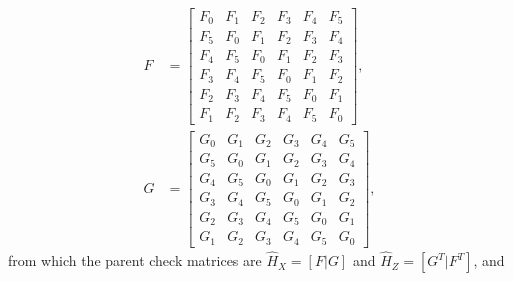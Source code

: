 \begin{align}
F &= \begin{bmatrix}
F_0 & F_1 & F_2 & F_3 & F_4 & F_5\\
F_5 & F_0 & F_1 & F_2 & F_3 & F_4\\
F_4 & F_5 & F_0 & F_1 & F_2 & F_3\\
F_3 & F_4 & F_5 & F_0 & F_1 & F_2\\
F_2 & F_3 & F_4 & F_5 & F_0 & F_1\\
F_1 & F_2 & F_3 & F_4 & F_5 & F_0
\end{bmatrix},\label{eq:F}\\[6pt]
G &= \begin{bmatrix}
G_0 & G_1 & G_2 & G_3 & G_4 & G_5\\
G_5 & G_0 & G_1 & G_2 & G_3 & G_4\\
G_4 & G_5 & G_0 & G_1 & G_2 & G_3\\
G_3 & G_4 & G_5 & G_0 & G_1 & G_2\\
G_2 & G_3 & G_4 & G_5 & G_0 & G_1\\
G_1 & G_2 & G_3 & G_4 & G_5 & G_0
\end{bmatrix},
\end{align}
from which the parent check matrices are $\hat H_X = [F|G]$ and $\hat H_Z = [G^T|F^T]$,
and 

